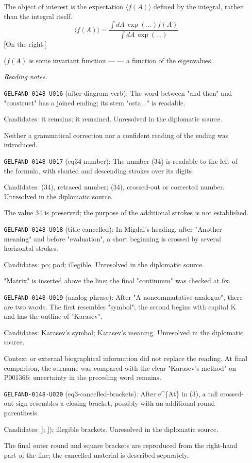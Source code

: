 The object of interest is the expectation $\langle f(A)\rangle$ defined by the integral, rather than the integral itself.
\begin{equation*}
\langle f(A)\rangle=
\frac{\int dA\,\exp(\ldots)f(A)}{\int dA\,\exp(\ldots)} \tag{6}
\end{equation*}
[On the right:]

($f(A)$ is some invariant function ---
\newline
--- a function of the eigenvalues


\par\smallskip\noindent\textit{Reading notes.}\par
\noindent\texttt{GELFAND-0148-U016} (after-diagram-verb): The word between "and then" and "construct" has a joined ending; its stem "osta..." is readable.\par
Candidates: it remains; it remained. Unresolved in the diplomatic source.\par
Neither a grammatical correction nor a confident reading of the ending was introduced.\par
\noindent\texttt{GELFAND-0148-U017} (eq34-number): The number (34) is readable to the left of the formula, with slanted and descending strokes over its digits.\par
Candidates: (34), retraced number; (34), crossed-out or corrected number. Unresolved in the diplomatic source.\par
The value 34 is preserved; the purpose of the additional strokes is not established.\par
\noindent\texttt{GELFAND-0148-U018} (title-cancelled): In Migdal's heading, after "Another meaning" and before "evaluation", a short beginning is crossed by several horizontal strokes.\par
Candidates: po; pod; illegible. Unresolved in the diplomatic source.\par
"Matrix" is inserted above the line; the final "continuum" was checked at 6x.\par
\noindent\texttt{GELFAND-0148-U019} (analog-phrase): After "A noncommutative analogue", there are two words. The first resembles "symbol"; the second begins with capital K and has the outline of "Karasev".\par
Candidates: Karasev's symbol; Karasev's meaning. Unresolved in the diplomatic source.\par
Context or external biographical information did not replace the reading. At final comparison, the surname was compared with the clear "Karasev's method" on P001366; uncertainty in the preceding word remains.\par
\noindent\texttt{GELFAND-0148-U020} (eq3-cancelled-brackets): After e\textasciicircum{}\{At\} in (3), a tall crossed-out sign resembles a closing bracket, possibly with an additional round parenthesis.\par
Candidates: ]; ]); illegible brackets. Unresolved in the diplomatic source.\par
The final outer round and square brackets are reproduced from the right-hand part of the line; the cancelled material is described separately.\par


